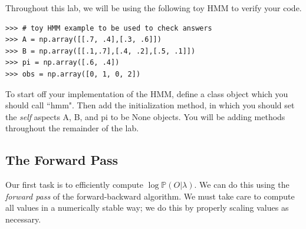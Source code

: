 Throughout this lab, we will be using the following toy HMM to verify your code.
\begin{lstlisting}
>>> # toy HMM example to be used to check answers
>>> A = np.array([[.7, .4],[.3, .6]])
>>> B = np.array([[.1,.7],[.4, .2],[.5, .1]])
>>> pi = np.array([.6, .4])
>>> obs = np.array([0, 1, 0, 2])
\end{lstlisting}

\begin{problem}

To start off your implementation of the HMM, define a class object which you should call ``hmm".
Then add the initialization method, in which you should set the \emph{self} aspects A, B, and pi to be None objects.
You will be adding methods throughout the remainder of the lab.
\end{problem}

\subsection*{The Forward Pass}
Our first task is to efficiently compute $\log \mathbb{P}(O | \lambda)$.
We can do this using the \emph{forward pass} of the forward-backward algorithm.
We must take care to compute all values in a numerically stable way; we do this by properly scaling values as necessary.

